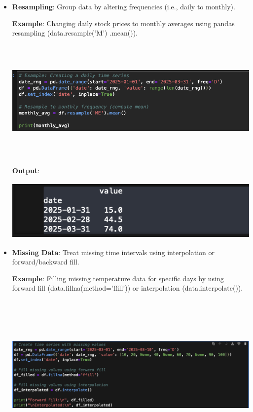 \documentclass{article}
\begin{document}
\begin{itemize}
\begin{itemize}
\item \textbf{Resampling}: Group data by altering frequencies (i.e., daily to monthly).

\textbf{Example}: Changing daily stock prices to monthly averages using pandas resampling 
(data.resample('M')
.mean()).

\includegraphics[width=14cm,height=6cm]{Resampling.png}

\textbf{Output}:

\includegraphics[width=14cm,height=3cm]{Resampling_Output.png}
\item \textbf{Missing Data}: Treat missing time intervals using interpolation or forward/backward fill.

\textbf{Example}: Filling missing temperature data for specific days by using forward fill (data.fillna(method='ffill')) or interpolation (data.interpolate()).

\includegraphics[width=14cm,height=8cm]{Missing.png}


\end{itemize}
\end{itemize}
\end{document}
